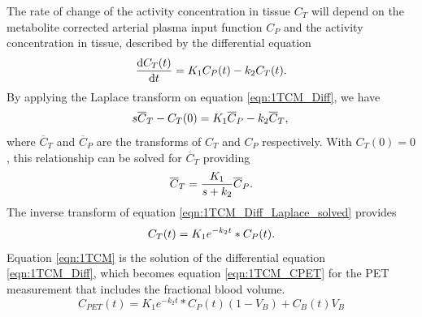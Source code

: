 The rate of change of the activity concentration in tissue $C_T$ will depend on the metabolite corrected arterial plasma input function $C_P$ and the activity concentration in tissue, described by the differential equation
%
\begin{equation}
  \frac{\mathrm d C_T(t)}{\mathrm d t} = K_1 C_P(t) - k_2 C_T(t) \\ . \\
  \label{eqn:1TCM_Diff}
\end{equation}
By applying the Laplace transform on equation \ref{eqn:1TCM_Diff}, we have
\begin{equation}
  s \overline{C}_T - C_T(0) = K_1 \overline{C}_P - k_2 \overline{C}_T  \\  ,  \\ 
  \label{eqn:1TCM_Diff_Laplace}
\end{equation}
where $\overline{C}_T$ and $\overline{C}_P$ are the transforms of ${C_T}$ and ${C_P}$ respectively. With $C_T(0)=0$, this relationship can be solved for $\overline{C}_T$ providing
\begin{equation}
\overline{C}_T =  \frac{K_1}{s+k_2} \overline{C}_P  \\  .  \\ 
  \label{eqn:1TCM_Diff_Laplace_solved}
\end{equation}
The inverse transform of equation \ref{eqn:1TCM_Diff_Laplace_solved} provides
\begin{equation}
   C_T(t) = K_1 e^{-k_2 t} \ast C_P(t)  \\  .  \\  
  \label{eqn:1TCM}
\end{equation}
Equation \ref{eqn:1TCM} is the solution of the differential equation \ref{eqn:1TCM_Diff}, which becomes equation \ref{eqn:1TCM_CPET} for the PET measurement that includes the fractional blood volume. 
%
\begin{equation}
   C_{PET}(t) =   K_1 e^{-k_2 t} \ast C_P(t) (1-V_B) + C_B(t) V_B
  \label{eqn:1TCM_CPET}
\end{equation}
%


